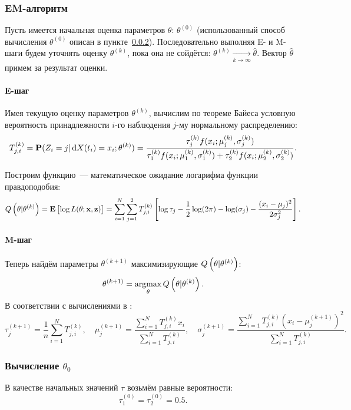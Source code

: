 \documentclass[a4paper,10pt]{article}
\DeclareMathOperator*{\argmax}{\arg\!\max}
\begin{document}
\subsubsection{EM-алгоритм}
Пусть имеется начальная оценка параметров $\theta$: $\theta^{(0)}$ 
(использованный способ вычисления $\theta^{(0)}$ описан 
в пункте~\ref{EM-theta0}).
Последовательно выполняя E- и M-шаги будем уточнять оценку $\theta^{(k)}$,
пока она не сойдётся:
$\theta^{(k)} \xrightarrow[k \rightarrow \infty]{} \widehat{\theta}$.
Вектор $\widehat{\theta}$ примем за результат оценки.

\paragraph*{E-шаг}
Имея текущую оценку параметров $\theta^{(k)}$, вычислим по теореме Байеса 
условную вероятность принадлежности $i$-го наблюдения $j$-му нормальному 
распределению:
$$
T_{j,i}^{(k)} = \mathbf{P}(Z_i = j \vert \dif X(t_i) = x_i; \theta^{(k)}) =
  \frac{\tau_j^{(k)} f(x_i; \mu_j^{(k)}, \sigma_j^{(k)})}
       {\tau_1^{(k)} f(x_i; \mu_1^{(k)}, \sigma_1^{(k)}) + 
       {\tau_2^{(k)} f(x_i; \mu_2^{(k)}, \sigma_2^{(k)})}}.
$$

Построим функцию~--- математическое ожидание логарифма функции правдоподобия:
$$
Q\del{\theta \vert \theta^{(k)}} = 
  \mathbf{E}\sbr{\log L(\theta; \mathbf{x}, \mathbf{z})} =
  \sum\limits_{i=1}^{N} \sum\limits_{j=1}^2
    T_{j,i}^{(k)} 
      \sbr{
        \log \tau_j - 
        \frac{1}{2}\log(2\pi) -
        \log(\sigma_j) -
        \frac{(x_i - \mu_j)^2}{2 \sigma_j^2}
      }.
$$

\paragraph*{M-шаг}%
Теперь найдём параметры $\theta^{(k+1)}$ максимизирующие 
$Q\del{\theta \vert \theta^{(k)}}$:
$$
\theta^{(k+1)} = \argmax\limits_{\theta} Q\del{\theta \vert \theta^{(k)}}.
$$
В соответствии с вычислениями в \cite{wiki:em-algorithm}:
$$
\tau_j^{(k+1)} = \frac{1}{n} \sum\limits_{i=1}^{N} T_{j,i}^{(k)},\quad
\mu_j^{(k+1)} = \frac
  {\sum\limits_{i=1}^{N} T_{j,i}^{(k)} x_i}
  {\sum\limits_{i=1}^{N} T_{j,i}^{(k)}},\quad
\sigma_j^{(k+1)} = \frac
  {\sum\limits_{i=1}^{N} T_{j,i}^{(k)} (x_i - \mu_j^{(k+1)})^2}
  {\sum\limits_{i=1}^{N} T_{j,i}^{(k)}}.
$$

\subsubsection{Вычисление $\theta_0$}%
\label{EM-theta0}
В качестве начальных значений $\tau$ возьмём равные вероятности:
$$
\tau_1^{(0)} = \tau_2^{(0)} = 0.5.
$$
\end{document}
